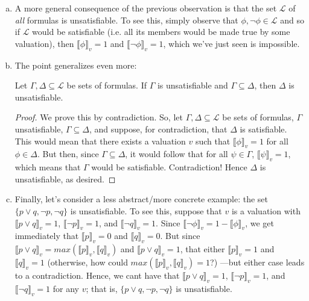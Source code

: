 \begin{enumerate}[\thesection.1]
\begin{enumerate}[(a)]
			\item A more general consequence of the previous observation is that the set $\mathcal{L}$ of \emph{all} formulas is unsatisfiable. To see this, simply observe that $\phi,\neg\phi\in\mathcal{L}$ and so if $\mathcal{L}$ would be satisfiable (i.e. all its members would be made true by some valuation), then $\llbracket\phi\rrbracket_v=1$ and $\llbracket\neg \phi\rrbracket_v=1$, which we've just seen is impossible.
			
			\item The point generalizes even more:
			
			\begin{proposition}
			Let $\Gamma,\Delta\subseteq\mathcal{L}$ be sets of formulas. If $\Gamma$ is unsatisfiable and $\Gamma\subseteq \Delta$, then $\Delta$ is unsatisfiable.
			\end{proposition}
			\begin{proof}
			We prove this by contradiction. So, let $\Gamma,\Delta\subseteq\mathcal{L}$ be sets of formulas, $\Gamma$ unsatisfiable, $\Gamma\subseteq \Delta$, and suppose, for contradiction, that $\Delta$ is satisfiable. This would mean that there exists a valuation $v$ such that $\llbracket\phi\rrbracket_v=1$ for all $\phi\in\Delta$. But then, since $\Gamma\subseteq\Delta$, it would follow that for all $\psi\in\Gamma$, $\llbracket\psi\rrbracket_v=1$, which means that $\Gamma$ would be satisfiable. Contradiction! Hence $\Delta$ is unsatisfiable, as desired.
		\end{proof}
		
		
		  \item Finally, let's consider a less abstract/more concrete example:
			the set
			$\{p\lor q, \neg p, \neg q\}$
			is unsatisfiable.
			To see this,
			suppose that $v$ is a valuation with
			$\llbracket p\lor q\rrbracket_v=1$,
			$\llbracket\neg p\rrbracket_v=1$,
			and $\llbracket\neg q\rrbracket_v=1$.
			Since $\llbracket\neg\phi\rrbracket_v=1-\llbracket\phi\rrbracket_v$,
			we get immediately that  $\llbracket p\rrbracket_v=0$ and $\llbracket q\rrbracket_v=0$.
			But since
			$\llbracket p\lor q\rrbracket_v=max(\llbracket p\rrbracket_v, \llbracket q\rrbracket_v)$
			and  $\llbracket p\lor q\rrbracket_v=1$,
			that either
			$\llbracket p\rrbracket_v=1$
			and $\llbracket q\rrbracket_v=1$
			(otherwise, how could $max(\llbracket p\rrbracket_v, \llbracket q\rrbracket_v)=1$?)
			---but either case leads to a contradiction.
			Hence, we cant have that
			$\llbracket p\lor q\rrbracket_v=1$,
			$\llbracket\neg p\rrbracket_v=1$,
			and $\llbracket\neg q\rrbracket_v=1$ for any $v$; that is,
			$\{p\lor q, \neg p, \neg q\}$
			is unsatisfiable.
		

\end{enumerate}
\end{enumerate}
